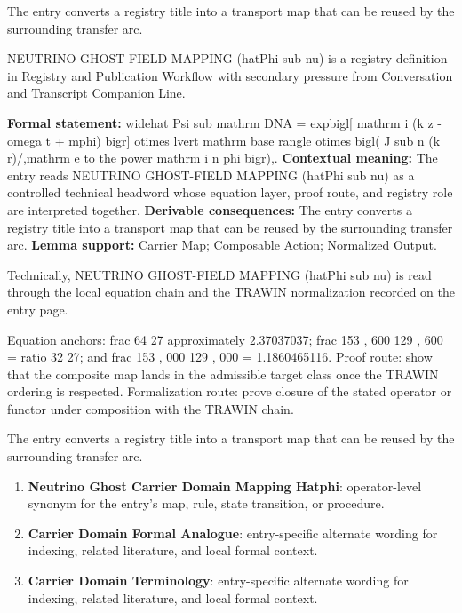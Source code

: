 The entry converts a registry title into a transport map that can be reused by the surrounding transfer arc.
\clearpage


\begingroup\small
{}
NEUTRINO GHOST-FIELD MAPPING (hatPhi sub nu) is a registry definition in Registry and Publication Workflow with secondary pressure from Conversation and Transcript Companion Line.

\begingroup\footnotesize\setlength{\emergencystretch}{3em}\sloppy
\textbf{Formal statement:} widehat Psi sub mathrm DNA = expbigl[ mathrm i (k z - omega t + mphi) bigr] otimes lvert mathrm base rangle otimes bigl( J sub n (k r)/,mathrm e to the power mathrm i n phi bigr),. \textbf{Contextual meaning:} The entry reads NEUTRINO GHOST-FIELD MAPPING (hatPhi sub nu) as a controlled technical headword whose equation layer, proof route, and registry role are interpreted together. \textbf{Derivable consequences:} The entry converts a registry title into a transport map that can be reused by the surrounding transfer arc. \textbf{Lemma support:} Carrier Map; Composable Action; Normalized Output.\par
\endgroup

Technically, NEUTRINO GHOST-FIELD MAPPING (hatPhi sub nu) is read through the local equation chain and the TRAWIN normalization recorded on the entry page.

Equation anchors: frac 64 27 approximately 2.37037037; frac 153 , 600 129 , 600 = ratio 32 27; and frac 153 , 000 129 , 000 = 1.1860465116. Proof route: show that the composite map lands in the admissible target class once the TRAWIN ordering is respected. Formalization route: prove closure of the stated operator or functor under composition with the TRAWIN chain.

The entry converts a registry title into a transport map that can be reused by the surrounding transfer arc.
\endgroup

\begin{enumerate}[leftmargin=1.6em,itemsep=6pt,topsep=4pt]
\item \textbf{Neutrino Ghost Carrier Domain Mapping Hatphi}: operator-level synonym for the entry's map, rule, state transition, or procedure.
\item \textbf{Carrier Domain Formal Analogue}: entry-specific alternate wording for indexing, related literature, and local formal context.
\item \textbf{Carrier Domain Terminology}: entry-specific alternate wording for indexing, related literature, and local formal context.
\end{enumerate}

